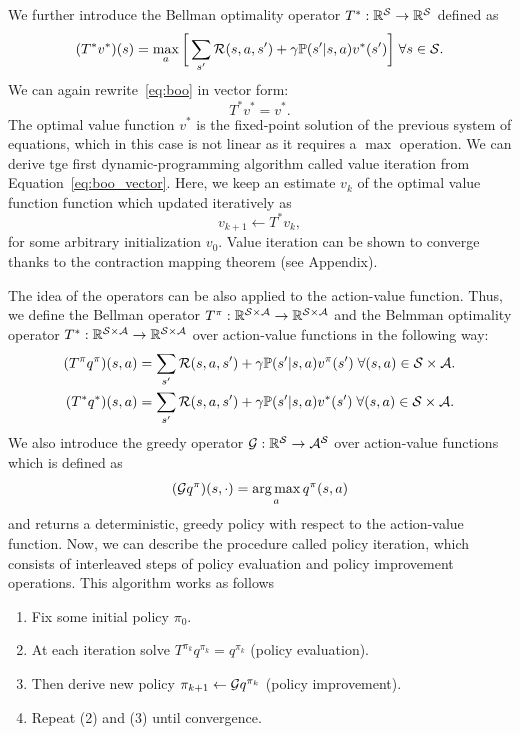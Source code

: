 We further introduce the Bellman optimality operator $T^*:\mathbb{R}^{\mathcal{S}}\rightarrow \mathbb{R}^{\mathcal{S}}$ defined as
\begin{equation}
  (T^* v^*)(s) = \max_a \bigg[\sum_{s'} \mathcal{R}(s, a, s') + \gamma \mathbb{P}(s'\lvert s, a)v^*(s')\bigg]\;\forall s\in\mathcal{S}.
  \label{eq:boo}
\end{equation}
We can again rewrite~\ref{eq:boo} in vector form:
\begin{equation}
  T ^* v^* = v^*.
  \label{eq:boo_vector}
\end{equation}
The optimal value function $v^*$ is the fixed-point solution of the previous system of equations, which in this case is not linear as it requires a $\max$ operation. We can derive tge first dynamic-programming algorithm called value iteration from Equation~\ref{eq:boo_vector}. Here, we keep an estimate $v_k$ of the optimal value function function which updated iteratively as \[v_{k+1}\leftarrow T^* v_k,\] for some arbitrary initialization $v_0$. Value iteration can be shown to converge thanks to the contraction mapping theorem (see Appendix).

The idea of the operators can be also applied to the action-value function. Thus, we define the Bellman operator $T^\pi:\mathbb{R}^{\mathcal{S}\times\mathcal{A}}\rightarrow\mathbb{R}^{\mathcal{S}\times\mathcal{A}}$ and the Belmman optimality operator $T^*:\mathbb{R}^{\mathcal{S}\times\mathcal{A}}\rightarrow\mathbb{R}^{\mathcal{S}\times\mathcal{A}}$ over action-value functions in the following way:
\begin{align}
(T^\pi q^\pi)(s, a) &= \sum_{s'} \mathcal{R}(s, a, s') + \gamma \mathbb{P}(s'\lvert s, a)v^\pi(s')\;\forall (s, a)\in\mathcal{S}\times\mathcal{A}. \\
(T^* q^*)(s, a) &= \sum_{s'} \mathcal{R}(s, a, s') + \gamma \mathbb{P}(s'\lvert s, a)v^*(s')\;\forall (s, a)\in\mathcal{S}\times\mathcal{A}.
\end{align}
We also introduce the greedy operator $\mathcal{G}:\mathbb{R}^{\mathcal{S}}\rightarrow\mathcal{A}^{\mathcal{S}}$ over action-value functions which is defined as 
\begin{equation}
  (\mathcal{G} q^\pi)(s, \cdot) = \operatorname*{arg\,max}_a q^\pi(s, a) 
\end{equation}
and returns a deterministic, greedy policy with respect to the action-value function.
Now, we can describe the procedure called policy iteration, which consists of interleaved steps of policy evaluation and policy improvement operations. This algorithm works as follows
 \begin{enumerate}[label=(\arabic*)]
  \item Fix some initial policy $\pi_0$.
  \item At each iteration solve $T^{\pi_k} q^{\pi_k} = q^{\pi_k}$ (policy evaluation).
  \item Then derive new policy $\pi_{k+1}\leftarrow\mathcal{G} q^{\pi_k}$ (policy improvement).
  \item Repeat (2) and (3) until convergence.
\end{enumerate}



